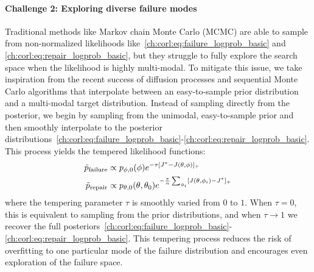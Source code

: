 \paragraph{Challenge 2: Exploring diverse failure modes} Traditional methods like Markov chain Monte Carlo (MCMC) are able to sample from non-normalized likelihoods like~\eqref{ch:corl:eq:failure_logprob_basic} and \eqref{ch:corl:eq:repair_logprob_basic}, but they struggle to fully explore the search space when the likelihood is highly multi-modal. To mitigate this issue, we take inspiration from the recent success of diffusion processes \cite{songScoreBasedGenerativeModeling2023,zhongGuidedConditionalDiffusion2022} and sequential Monte Carlo algorithms \cite{rubinoIntroductionRareEvent2009a} that interpolate between an easy-to-sample prior distribution and a multi-modal target distribution. Instead of sampling directly from the posterior, we begin by sampling from the unimodal, easy-to-sample prior and then smoothly interpolate to the posterior distributions~\eqref{ch:corl:eq:failure_logprob_basic}-\eqref{ch:corl:eq:repair_logprob_basic}. This process yields the tempered likelihood functions:
%
\begin{align}
    \tilde{p}_{\rm{failure}} & \propto p_{\phi, 0}(\phi)e^{-\tau[J^* - J(\theta, \phi)]_+} \label{ch:corl:eq:failure_logprob_tempered}                                     \\
    \tilde{p}_{\rm{repair}}  & \propto p_{\theta, 0}(\theta, \theta_0)e^{-\frac{\tau}{n}\sum_{\phi_i}[J(\theta, \phi_i)-J^*]_+} \label{ch:corl:eq:repair_logprob_tempered}
\end{align}
%
where the tempering parameter $\tau$ is smoothly varied from $0$ to $1$. When $\tau = 0$, this is equivalent to sampling from the prior distributions, and when $\tau \to 1$ we recover the full posteriors~\eqref{ch:corl:eq:failure_logprob_basic}-\eqref{ch:corl:eq:repair_logprob_basic}. This tempering process reduces the risk of overfitting to one particular mode of the failure distribution and encourages even exploration of the failure space.

